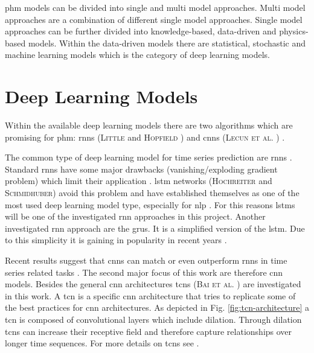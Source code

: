 \documentclass[conference]{IEEEtran}
\begin{document}
\gls{phm} models can be divided into single and multi model approaches. Multi model approaches are a combination of different single model approaches. Single model approaches can be further divided into knowledge-based, data-driven and physics-based models. Within the data-driven models there are statistical, stochastic and machine learning models which is the category of deep learning models. \cite{MONTEROJIMENEZ2020539}

\section{Deep Learning Models}
\label{sec:deep-learning-models}

Within the available deep learning models there are two algorithms which are promising for \gls{phm}: \glspl{rnn} (\textsc{Little} \cite{Little1996} and \textsc{Hopfield}  \cite{Hopfield1982}) and \glspl{cnn} (\textsc{Lecun et al.} \cite{Lecun1998}) \cite{Akrim2021}.

The common type of deep learning model for time series prediction are \glspl{rnn} \cite{Bai2018}. Standard \glspl{rnn} have some major drawbacks (vanishing/exploding gradient problem) which limit their application \cite{Bengio1994}. \gls{lstm} networks (\textsc{Hochreiter} and \textsc{Schmidhuber}) \cite{Hochreiter1997} avoid this problem and have established themselves as one of the most used deep learning model type, especially for \gls{nlp} \cite{Wu2016}. For this reasons \glspl{lstm} will be one of the investigated \gls{rnn} approaches in this project. Another investigated \gls{rnn} approach are the \glspl{gru}. It is a simplified version of the \gls{lstm}. Due to this simplicity it is gaining in popularity in recent years \cite{Rana2016}. 

Recent results suggest that \glspl{cnn} can match or even outperform \glspl{rnn} in time series related tasks \cite{Bai2018}. The second major focus of this work are therefore \gls{cnn} models. Besides the general \gls{cnn} architectures \glspl{tcn} (\textsc{Bai et al.} \cite{Bai2018}) are investigated in this work. A \gls{tcn} is a specific \gls{cnn} architecture that tries to replicate some of the best practices for \gls{cnn} architectures. As depicted in Fig. \ref{fig:tcn-architecture} a \gls{tcn} is composed of convolutional layers which include dilation. Through dilation \glspl{tcn} can increase their receptive field and therefore capture relationships over longer time sequences. For more details on \glspl{tcn} see \cite{Bai2018}.
\end{document}
